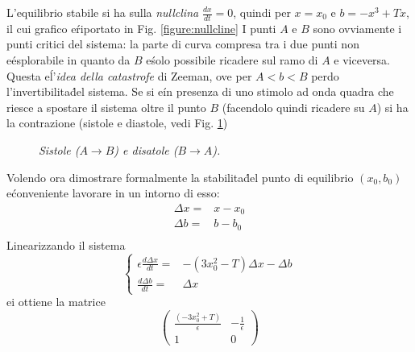 \documentclass[12pt, a4paper]{book}
\theoremstyle{theorem}
\begin{document}
			L'equilibrio stabile si ha sulla \emph{nullclina} $\frac{dx}{dt}=0$, quindi per $x=x_{0}$ e $b=-x^3+Tx$, il cui grafico e\' riportato in Fig. \ref{figure:nullcline}
			I punti $A$ e $B$ sono ovviamente i punti critici del sistema: la parte di curva compresa tra i due punti non e\' esplorabile in quanto da $B$ e\' solo possibile ricadere sul ramo di $A$ e viceversa.
			Questa e\' l'\emph{idea della catastrofe} di Zeeman, ove per $A<b<B$ perdo l'invertibilita\' del sistema.
			Se si e\' in presenza di uno stimolo ad onda quadra che riesce a spostare il sistema oltre il punto $B$ (facendolo quindi ricadere su $A$) si ha la contrazione (sistole e diastole, vedi Fig. \ref{figure:sistole_diastole})
			\begin{figure}[H]
				\centering
				\caption{\emph{Sistole ($A\to B$) e disatole ($B\to A$).}}
				\label{figure:sistole_diastole}
			\end{figure}
			Volendo ora dimostrare formalmente la stabilita\' del punto di equilibrio $(x_0,b_0)$ e\' conveniente lavorare in un intorno di esso:
			\begin{equation*}
				\begin{split}
					\Delta x =& x-x_0\\
					\Delta b =& b-b_0\\
				\end{split}
			\end{equation*}
			Linearizzando il sistema
			\begin{equation*}
				\begin{cases}
					\epsilon\frac{d\Delta x}{dt}=&-\left(3x_0^2-T\right)\Delta x-\Delta b\\
					\frac{d\Delta b}{dt}=&\Delta x
				\end{cases}
			\end{equation*}
			ei ottiene la matrice
			\begin{equation*}
				\left(
				\begin{matrix}
					\frac{\left(-3x_0^2+T\right)}{\epsilon} & -\frac{1}{\epsilon}\\
					1 & 0 
				\end{matrix}
				\right)
			\end{equation*}
\end{document}
